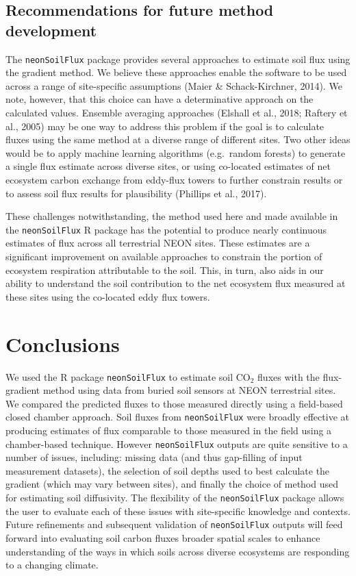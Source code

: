 \documentclass[
  letterpaper,
  DIV=11,
  numbers=noendperiod]{scrartcl}
\begin{document}
\subsection{Recommendations for future method
development}\label{recommendations-for-future-method-development}

The \texttt{neonSoilFlux} package provides several approaches to
estimate soil flux using the gradient method. We believe these
approaches enable the software to be used across a range of
site-specific assumptions (Maier \& Schack-Kirchner, 2014). We note,
however, that this choice can have a determinative approach on the
calculated values. Ensemble averaging approaches (Elshall et al., 2018;
Raftery et al., 2005) may be one way to address this problem if the goal
is to calculate fluxes using the same method at a diverse range of
different sites. Two other ideas would be to apply machine learning
algorithms (e.g.~random forests) to generate a single flux estimate
across diverse sites, or using co-located estimates of net ecosystem
carbon exchange from eddy-flux towers to further constrain results or to
assess soil flux results for plausibility (Phillips et al., 2017).

These challenges notwithstanding, the method used here and made
available in the \texttt{neonSoilFlux} R package has the potential to
produce nearly continuous estimates of flux across all terrestrial NEON
sites. These estimates are a significant improvement on available
approaches to constrain the portion of ecosystem respiration
attributable to the soil. This, in turn, also aids in our ability to
understand the soil contribution to the net ecosystem flux measured at
these sites using the co-located eddy flux towers.

\section{Conclusions}\label{conclusions}

We used the R package \texttt{neonSoilFlux} to estimate soil CO\(_2\)
fluxes with the flux-gradient method using data from buried soil sensors
at NEON terrestrial sites. We compared the predicted fluxes to those
measured directly using a field-based closed chamber approach. Soil
fluxes from \texttt{neonSoilFlux} were broadly effective at producing
estimates of flux comparable to those measured in the field using a
chamber-based technique. However \texttt{neonSoilFlux} outputs are quite
sensitive to a number of issues, including: missing data (and thus
gap-filling of input measurement datasets), the selection of soil depths
used to best calculate the gradient (which may vary between sites), and
finally the choice of method used for estimating soil diffusivity. The
flexibility of the \texttt{neonSoilFlux} package allows the user to
evaluate each of these issues with site-specific knowledge and contexts.
Future refinements and subsequent validation of \texttt{neonSoilFlux}
outputs will feed forward into evaluating soil carbon fluxes broader
spatial scales to enhance understanding of the ways in which soils
across diverse ecosystems are responding to a changing climate.
\end{document}
